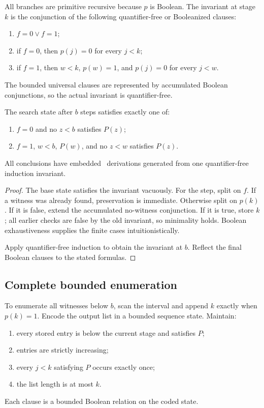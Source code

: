 All branches are primitive recursive because \(p\) is Boolean.  The invariant at stage \(k\) is the conjunction of the following quantifier-free or Booleanized clauses:
\begin{enumerate}
\item \(f=0\vee f=1\);
\item if \(f=0\), then \(p(j)=0\) for every \(j<k\);
\item if \(f=1\), then \(w<k\), \(p(w)=1\), and \(p(j)=0\) for every \(j<w\).
\end{enumerate}
The bounded universal clauses are represented by accumulated Boolean conjunctions, so the actual invariant is quantifier-free.

\begin{theorem}\label{thm:least-search}
The search state after \(b\) steps satisfies exactly one of:
\begin{enumerate}
\item \(f=0\) and no \(z<b\) satisfies \(P(z)\);
\item \(f=1\), \(w<b\), \(P(w)\), and no \(z<w\) satisfies \(P(z)\).
\end{enumerate}
All conclusions have embedded \iPRA\ derivations generated from one quantifier-free induction invariant.
\end{theorem}

\begin{proof}
The base state satisfies the invariant vacuously.  For the step, split on \(f\).  If a witness was already found, preservation is immediate.  Otherwise split on \(p(k)\).  If it is false, extend the accumulated no-witness conjunction.  If it is true, store \(k\); all earlier checks are false by the old invariant, so minimality holds.  Boolean exhaustiveness supplies the finite cases intuitionistically.

Apply quantifier-free induction to obtain the invariant at \(b\).  Reflect the final Boolean clauses to the stated formulas.
\end{proof}

\subsection{Complete bounded enumeration}

To enumerate all witnesses below \(b\), scan the interval and append \(k\) exactly when \(p(k)=1\).  Encode the output list in a bounded sequence state.  Maintain:
\begin{enumerate}
\item every stored entry is below the current stage and satisfies \(P\);
\item entries are strictly increasing;
\item every \(j<k\) satisfying \(P\) occurs exactly once;
\item the list length is at most \(k\).
\end{enumerate}
Each clause is a bounded Boolean relation on the coded state.


